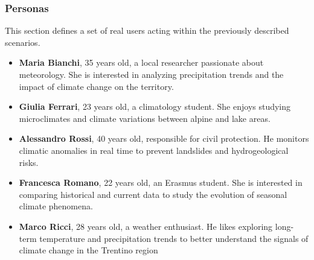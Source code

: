 \subsubsection{Personas}
This section defines a set of real users acting within the previously described scenarios.
\begin{itemize}
    \item \textbf{Maria Bianchi}, 35 years old, a local researcher passionate about meteorology. She is interested in analyzing precipitation trends and the impact of climate change on the territory.
    \item \textbf{Giulia Ferrari}, 23 years old, a climatology student. She enjoys studying microclimates and climate variations between alpine and lake areas.
    \item \textbf{Alessandro Rossi}, 40 years old, responsible for civil protection. He monitors climatic anomalies in real time to prevent landslides and hydrogeological risks.
    \item \textbf{Francesca Romano}, 22 years old, an Erasmus student. She is interested in comparing historical and current data to study the evolution of seasonal climate phenomena.
    \item \textbf{Marco Ricci}, 28 years old, a weather enthusiast. He likes exploring long-term temperature and precipitation trends to better understand the signals of climate change in the Trentino region
\end{itemize}




